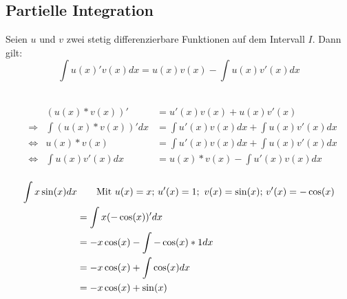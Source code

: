\documentclass[main.tex]{subfiles}
\begin{document}
\subsection{Partielle Integration}
\begin{Theorem}
  Seien $u$ und $v$ zwei stetig differenzierbare Funktionen auf dem Intervall $I$. Dann gilt:
  $$\int u(x)'v(x) dx= u(x)v(x) - \int u(x)v'(x) dx$$
\end{Theorem}
\begin{Beweis}\\
\begin{align*}
  &&(u(x)*v(x))' &= u'(x)v(x)+u(x)v'(x)\\
  &\Rightarrow & \int (u(x)*v(x))' dx &= \int u'(x)v(x)dx+\int u(x)v'(x)dx\\
  &\Leftrightarrow & u(x)*v(x) &= \int u'(x)v(x)dx + \int u(x)v'(x)dx\\
  &\Leftrightarrow & \int u(x)v'(x)dx &= u(x)*v(x)- \int u'(x)v(x)dx\\
\end{align*}
\end{Beweis}
\begin{Beispiel}
  \begin{align*}
  \int x\sin(x) dx & \text{\qquad Mit $u(x)=x$; $u'(x)=1$; \,$v(x)=\sin(x)$; $v'(x)=-\cos(x)$}\\
  &= \int x(-\cos(x))' dx\\
  &= -x\cos(x) - \int-\cos(x)*1 dx\\
  &= -x\cos(x) + \int\cos(x) dx\\
  &= -x\cos(x) + \sin(x)
\end{align*}
\end{Beispiel}
\end{document}
